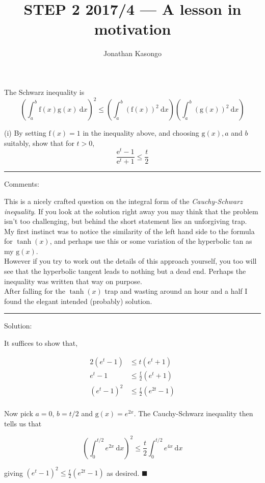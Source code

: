 \documentclass{article}
\author{Jonathan Kasongo}
\title{STEP 2 2017/4 --- A lesson in motivation}
\begin{document}
\maketitle

The Schwarz inequality is
$$
\left(\int_a^b \mathrm{f}(x) \mathrm{g}(x) \ \mathrm{d} x\right)^2 \leqslant\left(\int_a^b(\mathrm{f}(x))^2 \ \mathrm{d} x\right)\left(\int_a^b(\mathrm{g}(x))^2 \ \mathrm{d} x\right)
$$

(i) By setting $\mathrm{f}(x)=1$ in the inequality above, and choosing $\mathrm{g}(x), a$ and $b$ suitably, show that for $t>0$,
$$
\frac{\mathrm{e}^t-1}{\mathrm{e}^t+1} \leqslant \frac{t}{2}
$$

{\color{gray} \hrule}
\vspace{0.4cm}

{\sffamily Comments:}

This is a nicely crafted question on the integral form of the \textit{Cauchy-Schwarz inequality}. If you look at the solution right away you may think that the problem isn't too
challenging, but behind the short statement lies an unforgiving trap. \\

My first instinct was to notice the similarity of the left hand side to the formula for $\tanh(x)$, and perhaps use this or some variation of the hyperbolic tan as my
$\mathrm{g}(x)$. \\

However if you try to work out the details of this approach yourself, you too will see that the hyperbolic tangent leads to nothing but a dead end. Perhaps the inequality was
written that way on purpose. \\

After falling for the $\tanh(x)$ trap and wasting around an hour and a half I found the elegant intended (probably) solution. \\

{\color{gray} \hrule}
\vspace{0.4cm}

{\sffamily Solution:}

It suffices to show that,

\begin{align*}
2(e^t - 1) &\leq t(e^t + 1) \\
e^t - 1 &\leq \frac{t}{2}(e^t + 1) \\
(e^t - 1)^2 &\leq \frac{t}{2}(e^{2t} - 1) \\
\end{align*}

Now pick $a=0$, $b=t/2$ and $\mathrm{g}(x)=e^{2x}$. The Cauchy-Schwarz inequality then tells us that

$$
\left(\int^{t/2}_{0} e^{2x} \ \text{d}x \right)^2 \leq \frac{t}{2} \int^{t/2}_{0} e^{4x} \ \text{d}x
$$

giving $(e^t - 1)^2 \leq \frac{t}{2}(e^{2t} - 1)$ as desired. $\blacksquare$
\end{document}
